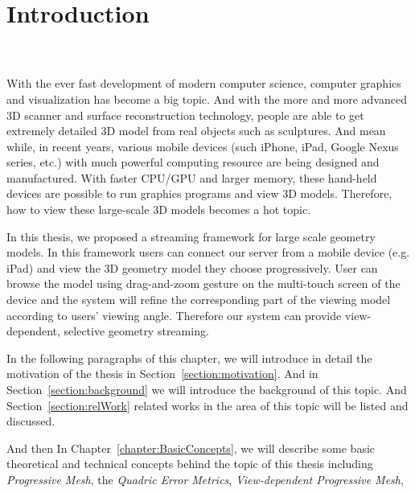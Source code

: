 \chapter{Introduction}
\label{chapter:introduction}
\\
\\

With the ever fast development of modern computer science, computer graphics and visualization has become a big topic. And with the more and more advanced 3D scanner and surface reconstruction technology, people are able to get extremely detailed 3D model from real objects such as sculptures. 
And mean while, in recent years, various mobile devices (such iPhone, iPad, Google Nexus series, etc.) with much powerful computing resource are being designed and manufactured. With faster CPU/GPU and larger memory, these hand-held devices are possible to run graphics programs and view 3D models. Therefore, how to view these large-scale 3D models becomes a hot topic. 

\smallskip

In this thesis, we proposed a streaming framework for large scale geometry models. In this framework users can connect our server from a mobile device (e.g. iPad) and view the 3D geometry model they choose progressively. User can browse the model using drag-and-zoom gesture on the multi-touch screen of the device and the system will refine the corresponding part of the viewing model according to users' viewing angle. Therefore our system can provide view-dependent, selective geometry streaming. 

\smallskip
In the following paragraphs of this chapter, we will introduce in detail the motivation of the thesis in Section~\ref{section:motivation}. And in Section~\ref{section:background} we will introduce the background of this topic. And Section~\ref{section:relWork} related works in the area of this topic will be listed and discussed. 

\smallskip
And then In Chapter~\ref{chapter:BasicConcepts}, we will describe some basic theoretical and technical concepts behind the topic of this thesis including \emph{Progressive Mesh}, the \emph{Quadric Error Metrics}, \emph{View-dependent Progressive Mesh}, \etc

